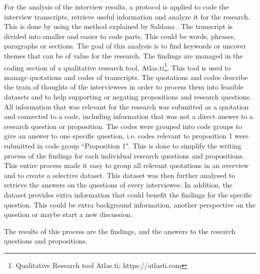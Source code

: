  For the analysis of the interview results, a protocol is applied to code the interview transcripts, retrieve useful information and analyze it for the research. This is done by using the method explained by Saldana \cite{saldana2015coding}. The transcript is divided into smaller and easier to code parts. This could be words, phrases, paragraphs or sections. The goal of this analysis is to find keywords or uncover themes that can be of value for the research. The findings are managed in the coding section of a qualitative research tool, Atlas.ti\footnote{Qualitative Research tool Atlas.ti; https://atlasti.com}. 
This tool is used to manage quotations and codes of transcripts. The quotations and codes describe the train of thoughts of the interviewees in order to process them into feasible datasets and to help supporting or negating propositions and research questions. All information that was relevant for the research was submitted as a quotation and connected to a code, including information that was not a direct answer to a research question or proposition. The codes were grouped into code groups to give an answer to one specific question, i.e. codes relevant to proposition 1 were submitted in code group ``Proposition 1". This is done to simplify the writing process of the findings for each individual research questions and propositions. This entire process made it easy to group all relevant quotations in an overview and to create a selective dataset. This dataset was then further analysed to retrieve the answers on the questions of every interviewee. In addition, the dataset provides extra information that could benefit the findings for the specific question. This could be extra background information, another perspective on the question or maybe start a new discussion. 

The results of this process are the findings, and the answers to the research questions and propositions.


